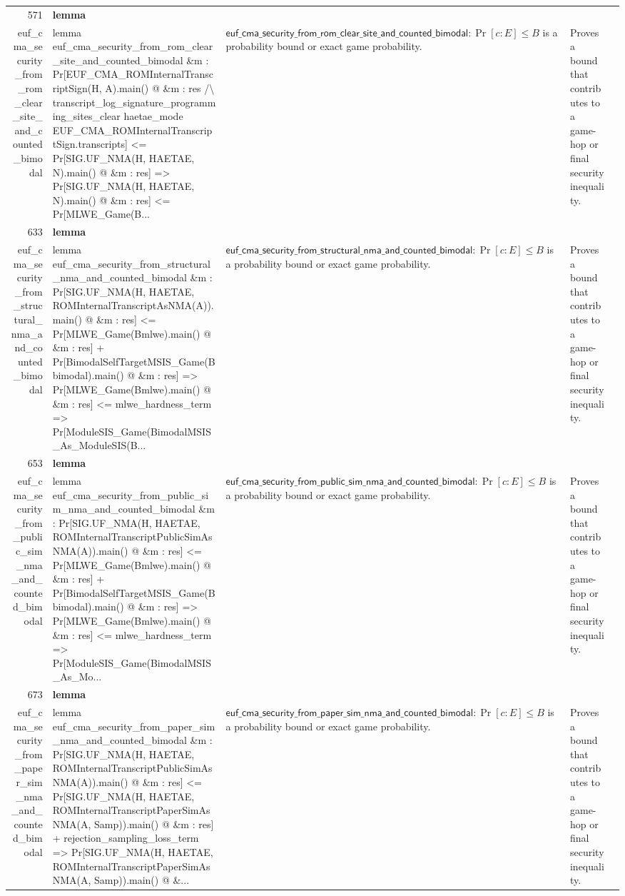 \documentclass[10pt]{article}
\newcommand{\ec}[1]{\begingroup\ttfamily\scriptsize #1\endgroup}
\begin{document}
\begin{longtable}{r L{0.17\textwidth} L{0.26\textwidth} L{0.27\textwidth} L{0.20\textwidth}}
571 & \textbf{lemma}\\\ec{euf\_cma\_security\_from\_rom\_clear\_site\_and\_counted\_bimodal} & \ec{lemma euf\_cma\_security\_from\_rom\_clear\_site\_and\_counted\_bimodal \&m : Pr[EUF\_CMA\_ROMInternalTranscriptSign(H, A).main() @ \&m : res /\textbackslash{} transcript\_log\_signature\_programming\_sites\_clear haetae\_mode EUF\_CMA\_ROMInternalTranscriptSign.transcripts] <= Pr[SIG.UF\_NMA(H, HAETAE, N).main() @ \&m : res] => Pr[SIG.UF\_NMA(H, HAETAE, N).main() @ \&m : res] <= Pr[MLWE\_Game(B...} & \(\mathsf{euf\_cma\_security\_from\_rom\_clear\_site\_and\_counted\_bimodal} : \Pr[c : E] \le B\) is a probability bound or exact game probability. & Proves a bound that contributes to a game-hop or final security inequality. \\
633 & \textbf{lemma}\\\ec{euf\_cma\_security\_from\_structural\_nma\_and\_counted\_bimodal} & \ec{lemma euf\_cma\_security\_from\_structural\_nma\_and\_counted\_bimodal \&m : Pr[SIG.UF\_NMA(H, HAETAE, ROMInternalTranscriptAsNMA(A)).main() @ \&m : res] <= Pr[MLWE\_Game(Bmlwe).main() @ \&m : res] + Pr[BimodalSelfTargetMSIS\_Game(Bbimodal).main() @ \&m : res] => Pr[MLWE\_Game(Bmlwe).main() @ \&m : res] <= mlwe\_hardness\_term => Pr[ModuleSIS\_Game(BimodalMSIS\_As\_ModuleSIS(B...} & \(\mathsf{euf\_cma\_security\_from\_structural\_nma\_and\_counted\_bimodal} : \Pr[c : E] \le B\) is a probability bound or exact game probability. & Proves a bound that contributes to a game-hop or final security inequality. \\
653 & \textbf{lemma}\\\ec{euf\_cma\_security\_from\_public\_sim\_nma\_and\_counted\_bimodal} & \ec{lemma euf\_cma\_security\_from\_public\_sim\_nma\_and\_counted\_bimodal \&m : Pr[SIG.UF\_NMA(H, HAETAE, ROMInternalTranscriptPublicSimAsNMA(A)).main() @ \&m : res] <= Pr[MLWE\_Game(Bmlwe).main() @ \&m : res] + Pr[BimodalSelfTargetMSIS\_Game(Bbimodal).main() @ \&m : res] => Pr[MLWE\_Game(Bmlwe).main() @ \&m : res] <= mlwe\_hardness\_term => Pr[ModuleSIS\_Game(BimodalMSIS\_As\_Mo...} & \(\mathsf{euf\_cma\_security\_from\_public\_sim\_nma\_and\_counted\_bimodal} : \Pr[c : E] \le B\) is a probability bound or exact game probability. & Proves a bound that contributes to a game-hop or final security inequality. \\
673 & \textbf{lemma}\\\ec{euf\_cma\_security\_from\_paper\_sim\_nma\_and\_counted\_bimodal} & \ec{lemma euf\_cma\_security\_from\_paper\_sim\_nma\_and\_counted\_bimodal \&m : Pr[SIG.UF\_NMA(H, HAETAE, ROMInternalTranscriptPublicSimAsNMA(A)).main() @ \&m : res] <= Pr[SIG.UF\_NMA(H, HAETAE, ROMInternalTranscriptPaperSimAsNMA(A, Samp)).main() @ \&m : res] + rejection\_sampling\_loss\_term => Pr[SIG.UF\_NMA(H, HAETAE, ROMInternalTranscriptPaperSimAsNMA(A, Samp)).main() @ \&...} & \(\mathsf{euf\_cma\_security\_from\_paper\_sim\_nma\_and\_counted\_bimodal} : \Pr[c : E] \le B\) is a probability bound or exact game probability. & Proves a bound that contributes to a game-hop or final security inequality. \\

\end{longtable}
\end{document}
